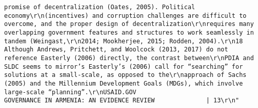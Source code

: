 \documentclass[
]{article}
\begin{document}
\begin{verbatim}
promise of decentralization (Oates, 2005). Political economy\r\n(incentives) and corruption challenges are difficult to overcome, and the proper design of decentralization\r\nrequires many overlapping government features and structures to work seamlessly in tandem (Weingast,\r\n2014; Mookherjee, 2015; Rodden, 2004).\r\n18 Although Andrews, Pritchett, and Woolcock (2013, 2017) do not reference Easterly (2006) directly, the contrast between\r\nPDIA and SLDC seems to mirror’s Easterly’s (2006) call for “searching” for solutions at a small-scale, as opposed to the\r\napproach of Sachs (2005) and the Millennium Development Goals (MDGs), which involve large-scale “planning”.\r\nUSAID.GOV                                                         GOVERNANCE IN ARMENIA: AN EVIDENCE REVIEW              | 13\r\n"                                                                                                                                                                                                                                                                                                                                                                                                                                                                                                                                                                                                                                                                                                                                                                                                                                                                                                                                          

\end{verbatim}
\end{document}
